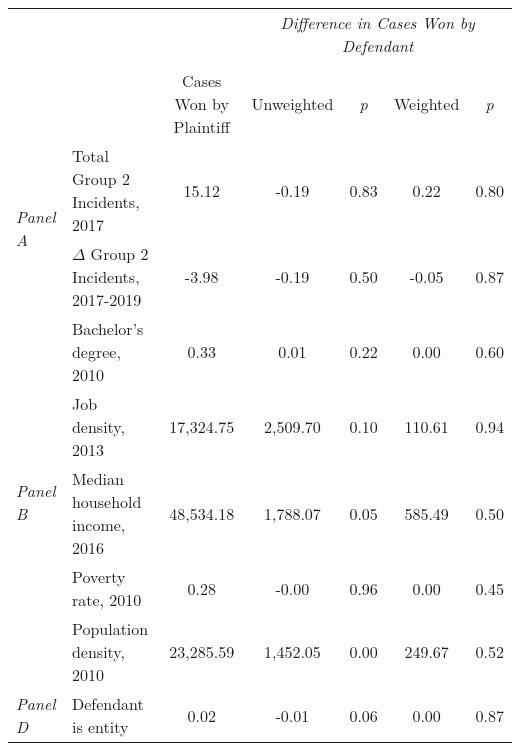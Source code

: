 \begin{tabular}{llccccc}
\toprule
 &  & \textit{} & \multicolumn{4}{c}{\textit{Difference in Cases Won by Defendant}} \\
\cline{4-7}
\\
 &  & Cases Won by Plaintiff & Unweighted & \emph{p} & Weighted & \emph{p} \\
\midrule
\multirow[c]{2}{3cm}{\textit{Panel A}} & Total Group 2 Incidents, 2017 & 15.12 & -0.19 & 0.83 & 0.22 & 0.80 \\
 & $\Delta$ Group 2 Incidents, 2017-2019 & -3.98 & -0.19 & 0.50 & -0.05 & 0.87 \\
\cline{1-7}
\multirow[c]{5}{3cm}{\textit{Panel B}} & Bachelor's degree, 2010 & 0.33 & 0.01 & 0.22 & 0.00 & 0.60 \\
 & Job density, 2013 & 17,324.75 & 2,509.70 & 0.10 & 110.61 & 0.94 \\
 & Median household income, 2016 & 48,534.18 & 1,788.07 & 0.05 & 585.49 & 0.50 \\
 & Poverty rate, 2010 & 0.28 & -0.00 & 0.96 & 0.00 & 0.45 \\
 & Population density, 2010 & 23,285.59 & 1,452.05 & 0.00 & 249.67 & 0.52 \\
\cline{1-7}
\textit{Panel D} & Defendant is entity & 0.02 & -0.01 & 0.06 & 0.00 & 0.87 \\
\cline{1-7}
\bottomrule
\end{tabular}
